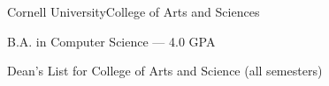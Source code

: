 \documentclass{resume}
\begin{document}
\begin{education}
    \begin{entryleft}{Cornell University}{College of Arts and Sciences}
        \begin{description}
            \item B.A. in Computer Science --- 4.0 GPA
            \item Dean's List for College of Arts and Science (all semesters)

        \end{description}
    \end{entryleft}
    \begin{entryright}
    \end{entryright}
\end{education}
\end{document}

